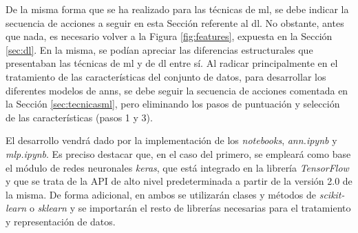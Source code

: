 De la misma forma que se ha realizado para las técnicas de \gls{ml}, se debe indicar la secuencia de acciones a seguir en esta Sección referente al \gls{dl}. No obstante, antes que nada, es necesario volver a la Figura \ref{fig:features}, expuesta en la Sección \ref{sec:dl}. En la misma, se podían apreciar las diferencias estructurales que presentaban las técnicas de \gls{ml} y de \gls{dl} entre sí. Al radicar principalmente en el tratamiento de las características del conjunto de datos, para desarrollar los diferentes modelos de \gls{ann}s, se debe seguir la secuencia de acciones comentada en la Sección \ref{sec:tecnicasml}, pero eliminando los pasos de puntuación y selección de las características (pasos 1 y 3).

\vspace{3mm}

El desarrollo vendrá dado por la implementación de los \textit{notebooks}, \textit{ann.ipynb} y \textit{mlp.ipynb}. Es preciso destacar que, en el caso del primero, se empleará como base el módulo de redes neuronales \textit{keras}, que está integrado en la librería \textit{TensorFlow} y que se trata de la API de alto nivel predeterminada a partir de la versión 2.0 de la misma. De forma adicional, en ambos se utilizarán clases y métodos de \textit{scikit-learn} o \textit{sklearn} y se importarán el resto de librerías necesarias para el tratamiento y representación de datos.




